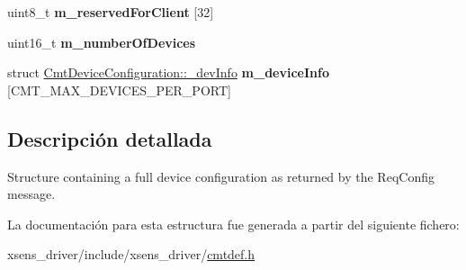 \begin{DoxyCompactItemize}
\item 
\hypertarget{structCmtDeviceConfiguration_af42e33aece97c252be383dc5d86b99de}{uint8\-\_\-t {\bfseries m\-\_\-reserved\-For\-Client} \mbox{[}32\mbox{]}}\label{structCmtDeviceConfiguration_af42e33aece97c252be383dc5d86b99de}

\item 
\hypertarget{structCmtDeviceConfiguration_a10237ebdf4af2e906b21f9a875c47fac}{uint16\-\_\-t {\bfseries m\-\_\-number\-Of\-Devices}}\label{structCmtDeviceConfiguration_a10237ebdf4af2e906b21f9a875c47fac}

\item 
\hypertarget{structCmtDeviceConfiguration_a8087a39ceea7917183a971b9d0e87d19}{struct \*
\hyperlink{structCmtDeviceConfiguration_1_1__devInfo}{\-Cmt\-Device\-Configuration\-::\-\_\-dev\-Info} {\bfseries m\-\_\-device\-Info} \mbox{[}\-C\-M\-T\-\_\-\-M\-A\-X\-\_\-\-D\-E\-V\-I\-C\-E\-S\-\_\-\-P\-E\-R\-\_\-\-P\-O\-R\-T\mbox{]}}\label{structCmtDeviceConfiguration_a8087a39ceea7917183a971b9d0e87d19}

\end{DoxyCompactItemize}


\subsection{\-Descripción detallada}
\-Structure containing a full device configuration as returned by the \-Req\-Config message. 



\-La documentación para esta estructura fue generada a partir del siguiente fichero\-:\begin{DoxyCompactItemize}
\item 
xsens\-\_\-driver/include/xsens\-\_\-driver/\hyperlink{cmtdef_8h}{cmtdef.\-h}\end{DoxyCompactItemize}
